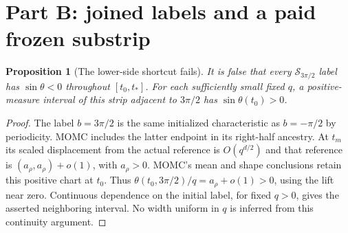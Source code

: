 \documentclass[11pt]{article}
\numberwithin{equation}{section}
\newtheorem{proposition}{Proposition}[section]
\theoremstyle{remark}\newtheorem{remark}[proposition]{Remark}
\newcommand{\Sm}{\mathcal S}
\begin{document}
\section{Part B: joined labels and a paid frozen substrip}
\begin{proposition}[The lower-side shortcut fails]
\label{an03q3sbv1:lowerfailure}
It is false that every $\Sm_{3\pi/2}$ label has
$\sin\theta<0$ throughout $[t_0,t_*]$.
For each sufficiently small fixed $q$, a positive-measure interval
of this strip adjacent to $3\pi/2$ has $\sin\theta(t_0)>0$.
\end{proposition}
\begin{proof}
The label $b=3\pi/2$ is the same initialized characteristic as
$b=-\pi/2$ by periodicity. MOMC includes the latter endpoint in its
right-half ancestry. At $t_m$ its scaled displacement from the actual
reference is $O(q^{d/2})$ and that reference is $(a_\rho,a_\rho)+o(1)$,
with $a_\rho>0$. MOMC's mean and shape conclusions retain this
positive chart at $t_0$. Thus
$\theta(t_0,3\pi/2)/q=a_\rho+o(1)>0$, using the lift near zero.
Continuous dependence on the initial label, for fixed $q>0$, gives
the asserted neighboring interval. No width uniform in $q$ is
inferred from this continuity argument.
\end{proof}
\end{document}
